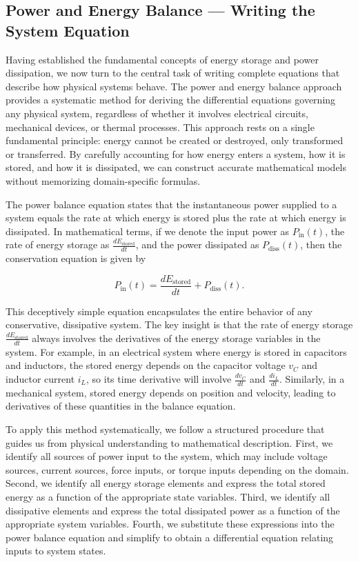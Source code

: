 \subsection{Power and Energy Balance — Writing the System Equation}

Having established the fundamental concepts of energy storage and power dissipation, we now turn to the central task of writing complete equations that describe how physical systems behave. The power and energy balance approach provides a systematic method for deriving the differential equations governing any physical system, regardless of whether it involves electrical circuits, mechanical devices, or thermal processes. This approach rests on a single fundamental principle: energy cannot be created or destroyed, only transformed or transferred. By carefully accounting for how energy enters a system, how it is stored, and how it is dissipated, we can construct accurate mathematical models without memorizing domain-specific formulas.

The power balance equation states that the instantaneous power supplied to a system equals the rate at which energy is stored plus the rate at which energy is dissipated. In mathematical terms, if we denote the input power as $P_{\text{in}}(t)$, the rate of energy storage as $\frac{dE_{\text{stored}}}{dt}$, and the power dissipated as $P_{\text{diss}}(t)$, then the conservation equation is given by

\[
P_{\text{in}}(t) = \frac{dE_{\text{stored}}}{dt} + P_{\text{diss}}(t).
\]

This deceptively simple equation encapsulates the entire behavior of any conservative, dissipative system. The key insight is that the rate of energy storage $\frac{dE_{\text{stored}}}{dt}$ always involves the derivatives of the energy storage variables in the system. For example, in an electrical system where energy is stored in capacitors and inductors, the stored energy depends on the capacitor voltage $v_C$ and inductor current $i_L$, so its time derivative will involve $\frac{dv_C}{dt}$ and $\frac{di_L}{dt}$. Similarly, in a mechanical system, stored energy depends on position and velocity, leading to derivatives of these quantities in the balance equation.

To apply this method systematically, we follow a structured procedure that guides us from physical understanding to mathematical description. First, we identify all sources of power input to the system, which may include voltage sources, current sources, force inputs, or torque inputs depending on the domain. Second, we identify all energy storage elements and express the total stored energy as a function of the appropriate state variables. Third, we identify all dissipative elements and express the total dissipated power as a function of the appropriate system variables. Fourth, we substitute these expressions into the power balance equation and simplify to obtain a differential equation relating inputs to system states.

